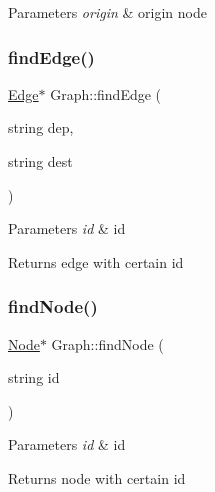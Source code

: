 \begin{DoxyParams}{Parameters}
{\em origin} & origin node \\
\hline
\end{DoxyParams}
\mbox{\label{class_graph_aa170b2747ece61cb271ef050357f2a75}} 
\subsubsection{\texorpdfstring{find\+Edge()}{findEdge()}}
{\footnotesize\ttfamily \mbox{\hyperlink{class_edge}{Edge}}$\ast$ Graph\+::find\+Edge (\begin{DoxyParamCaption}\item[{string}]{dep,  }\item[{string}]{dest }\end{DoxyParamCaption})\hspace{0.3cm}{\ttfamily [inline]}}


\begin{DoxyParams}{Parameters}
{\em id} & id \\
\hline
\end{DoxyParams}
\begin{DoxyReturn}{Returns}
edge with certain id 
\end{DoxyReturn}
\mbox{\label{class_graph_afdc074fadabe848450ff8fac1c555f8b}} 
\subsubsection{\texorpdfstring{find\+Node()}{findNode()}}
{\footnotesize\ttfamily \mbox{\hyperlink{class_node}{Node}}$\ast$ Graph\+::find\+Node (\begin{DoxyParamCaption}\item[{string}]{id }\end{DoxyParamCaption})\hspace{0.3cm}{\ttfamily [inline]}}


\begin{DoxyParams}{Parameters}
{\em id} & id \\
\hline
\end{DoxyParams}
\begin{DoxyReturn}{Returns}
node with certain id 
\end{DoxyReturn}
\mbox{\label{class_graph_ae4b8a4be11b1fcda91667400e127848d}} 
